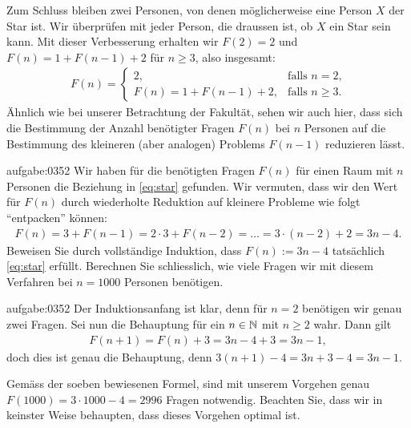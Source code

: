 \noindent
Zum Schluss bleiben zwei Personen, von denen möglicherweise eine Person $X$ der Star ist. Wir überprüfen mit jeder Person, die draussen ist, ob $X$ ein Star sein kann. Mit dieser Verbesserung erhalten wir $F(2) = 2$ und $F(n) = 1 + F(n-1) + 2$ für $n\geq 3$, also insgesamt:
\begin{align}\label{eq:star}
    F(n) =
    \begin{cases}
        2, &\text{falls $n=2$,} \\
        F(n) = 1 + F(n-1) + 2, & \text{falls  $n\geq 3$.}
      \end{cases}
\end{align}
Ähnlich wie bei unserer Betrachtung der Fakultät, sehen wir auch hier, dass sich die Bestimmung der Anzahl benötigter Fragen $F(n)$ bei $n$ Personen auf die Bestimmung des kleineren (aber analogen) Problems $F(n-1)$ reduzieren lässt.
\begin{aufgabe}{aufgabe:0352}
Wir haben für die benötigten Fragen $F(n)$ für einen Raum mit $n$ Personen die Beziehung in \cref{eq:star} gefunden. Wir vermuten, dass wir den Wert für $F(n)$ durch wiederholte Reduktion auf kleinere Probleme wie folgt \enquote{entpacken} können:
\begin{align*}
    F(n) = 3 + F(n-1) = 2\cdot 3 + F(n-2) = \ldots = 3\cdot (n-2) + 2 = 3n - 4.
\end{align*}
Beweisen Sie durch vollständige Induktion, dass $F(n) := 3n - 4$ tatsächlich \cref{eq:star} erfüllt. Berechnen Sie schliesslich, wie viele Fragen wir mit diesem Verfahren bei $n = 1000$ Personen benötigen.
\end{aufgabe}
\begin{antwort}{aufgabe:0352}
Der Induktionsanfang ist klar, denn für $n = 2$ benötigen wir genau zwei Fragen. Sei nun die Behauptung für ein $n\in\mathbb{N}$ mit $n\geq 2$ wahr. Dann gilt
\begin{align*}
    F(n+1) = F(n) + 3 = 3n-4 + 3 = 3n - 1,
\end{align*}
doch dies ist genau die Behauptung, denn $3(n+1)-4 = 3n+3-4=3n-1$.

Gemäss der soeben bewiesenen Formel, sind mit unserem Vorgehen genau $F(1000) = 3\cdot 1000 - 4 = 2996$ Fragen notwendig. Beachten Sie, dass wir in keinster Weise behaupten, dass dieses Vorgehen optimal ist.
\end{antwort}

\clearpage
